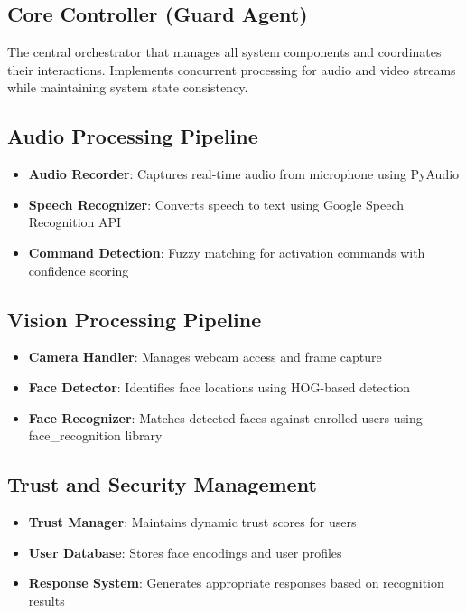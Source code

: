 \documentclass[11pt,a4paper]{article}
\begin{document}
\subsection{Core Controller (Guard Agent)}
The central orchestrator that manages all system components and coordinates their interactions. Implements concurrent processing for audio and video streams while maintaining system state consistency.

\subsection{Audio Processing Pipeline}
\begin{itemize}
    \item \textbf{Audio Recorder}: Captures real-time audio from microphone using PyAudio
    \item \textbf{Speech Recognizer}: Converts speech to text using Google Speech Recognition API
    \item \textbf{Command Detection}: Fuzzy matching for activation commands with confidence scoring
\end{itemize}

\subsection{Vision Processing Pipeline}
\begin{itemize}
    \item \textbf{Camera Handler}: Manages webcam access and frame capture
    \item \textbf{Face Detector}: Identifies face locations using HOG-based detection
    \item \textbf{Face Recognizer}: Matches detected faces against enrolled users using face\_recognition library
\end{itemize}

\subsection{Trust and Security Management}
\begin{itemize}
    \item \textbf{Trust Manager}: Maintains dynamic trust scores for users
    \item \textbf{User Database}: Stores face encodings and user profiles
    \item \textbf{Response System}: Generates appropriate responses based on recognition results
\end{itemize}
\end{document}
